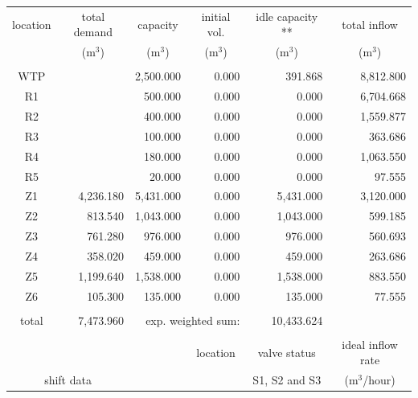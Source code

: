 \documentclass{singlecol}
\theoremstyle{TH}{
\newtheorem{lemma}{Lemma}
\newtheorem{theorem}[lemma]{Theorem}
\newtheorem{corrolary}[lemma]{Corrolary}
\newtheorem{conjecture}[lemma]{Conjecture}
\newtheorem{proposition}[lemma]{Proposition}
\newtheorem{claim}[lemma]{Claim}
\newtheorem{stheorem}[lemma]{Wrong Theorem}
\newtheorem{algorithm}{Algorithm}
}
\theoremstyle{THrm}{
\newtheorem{definition}{Definition}[section]
\newtheorem{question}{Question}[section]
\newtheorem{remark}{Remark}
\newtheorem{scheme}{Scheme}
}
\theoremstyle{THhit}{
\newtheorem{case}{Case}[section]
}
\begin{document}
\begin{table}[h!]
\begin{center}
\begin{small}
	\begin{tabular}{ c r r r r r } 
		location & \multicolumn{1}{c}{total demand}      & \multicolumn{1}{c}{capacity} & \multicolumn{1}{c}{initial vol.} & \multicolumn{1}{c}{idle capacity **} & \multicolumn{1}{c}{total inflow}  \\
		      & \multicolumn{1}{c}{($\mathrm{m^3}$)} & \multicolumn{1}{c}{($\mathrm{m^3}$)}   & \multicolumn{1}{c}{($\mathrm{m^3}$)}     &  \multicolumn{1}{c}{($\mathrm{m^3}$)}   &  \multicolumn{1}{c}{($\mathrm{m^3}$)}               \\
		\\
		WTP   &            & 2,500.000 & 0.000 &   391.868 & 8,812.800 \\
		R1    &            &   500.000 & 0.000 &     0.000 & 6,704.668 \\
		R2    &            &   400.000 & 0.000 &     0.000 & 1,559.877 \\
		R3    &            &   100.000 & 0.000 &     0.000 &   363.686 \\
	    R4    &            &   180.000 & 0.000 &     0.000 & 1,063.550 \\
	    R5    &            &    20.000 & 0.000 &     0.000 &    97.555 \\
	    Z1    &  4,236.180 & 5,431.000 & 0.000 & 5,431.000 & 3,120.000 \\
	    Z2    &    813.540 & 1,043.000 & 0.000 & 1,043.000 &   599.185 \\
	    Z3    &    761.280 &   976.000 & 0.000 &   976.000 &   560.693 \\
	    Z4    &    358.020 &   459.000 & 0.000 &   459.000 &   263.686 \\
	    Z5    &  1,199.640 & 1,538.000 & 0.000 & 1,538.000 &   883.550 \\
	    Z6    &    105.300 &   135.000 & 0.000 &   135.000 &    77.555 \\
	    \\
	    total & 7,473.960 & \multicolumn{2}{r}{exp. weighted sum:} & 10,433.624 & \\
		   \\
		&  &      &  \multicolumn{1}{c}{location}    & \multicolumn{1}{c}{valve status}         & \multicolumn{1}{c}{ideal inflow rate}   \\
		\multicolumn{2}{c}{shift data}     &   &      & \multicolumn{1}{c}{S1, S2 and S3}        & \multicolumn{1}{c}{($\mathrm{m^3}$/hour)}  \\

\end{tabular}
\end{small}
\end{center}
\end{table}
\end{document}
